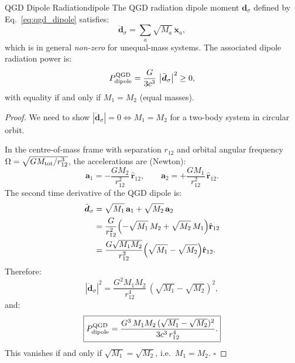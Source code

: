 \documentclass[11pt,a4paper]{article}
\theoremstyle{definition}
\theoremstyle{remark}
\newcommand{\bolda}{\mathbf{a}}
\newcommand{\bhat}[1]{\hat{\mathbf{#1}}}
\newcommand{\boldx}{\mathbf{x}}
\begin{document}
	\begin{theorem}{QGD Dipole Radiation}{dipole}
		The QGD radiation dipole moment $\boldsymbol{d}_\sigma$ defined by
		Eq.~\eqref{eq:qgd_dipole} satisfies:
		\begin{equation}
			\ddot{\boldsymbol{d}}_\sigma
			= \sum_a \sqrt{M_a}\,\ddot{\boldx}_a,
			\label{eq:dipole_ddot}
		\end{equation}
		which is in general \emph{non-zero} for unequal-mass systems.
		The associated dipole radiation power is:
		\begin{equation}
			P_{\rm dipole}^{\rm QGD}
			= \frac{G}{3c^3}\,\left|\ddot{\boldsymbol{d}}_\sigma\right|^2
			\geq 0,
			\label{eq:dipole_power}
		\end{equation}
		with equality if and only if $M_1=M_2$ (equal masses).
	\end{theorem}
	
	\begin{proof}
		We need to show $|\ddot{\boldsymbol{d}}_\sigma|=0\Leftrightarrow M_1=M_2$
		for a two-body system in circular orbit.
		
		In the centre-of-mass frame with separation $r_{12}$ and orbital
		angular frequency $\Omega=\sqrt{GM_{\rm tot}/r_{12}^3}$, the
		accelerations are (Newton):
		\begin{equation}
			\bolda_1 = -\frac{GM_2}{r_{12}^2}\,\bhat{r}_{12},
			\qquad
			\bolda_2 = +\frac{GM_1}{r_{12}^2}\,\bhat{r}_{12}.
			\label{eq:accelerations}
		\end{equation}
		The second time derivative of the QGD dipole is:
		\begin{align}
			\ddot{\boldsymbol{d}}_\sigma
			&= \sqrt{M_1}\,\bolda_1 + \sqrt{M_2}\,\bolda_2
			\nonumber\\
			&= \frac{G}{r_{12}^2}
			\Bigl(-\sqrt{M_1}\,M_2 + \sqrt{M_2}\,M_1\Bigr)\bhat{r}_{12}
			\nonumber\\
			&= \frac{G\sqrt{M_1 M_2}}{r_{12}^2}
			\Bigl(\sqrt{M_1}-\sqrt{M_2}\Bigr)\bhat{r}_{12}.
			\label{eq:dipole_ddot_explicit}
		\end{align}
		Therefore:
		\begin{equation}
			\left|\ddot{\boldsymbol{d}}_\sigma\right|^2
			= \frac{G^2 M_1 M_2}{r_{12}^4}\,(\sqrt{M_1}-\sqrt{M_2})^2,
			\label{eq:dipole_ddot_squared}
		\end{equation}
		and:
		\begin{equation}
			\boxed{
				P_{\rm dipole}^{\rm QGD}
				= \frac{G^3\,M_1 M_2\,(\sqrt{M_1}-\sqrt{M_2})^2}{3c^3\,r_{12}^4}.
			}
			\label{eq:dipole_power_explicit}
		\end{equation}
		This vanishes if and only if $\sqrt{M_1}=\sqrt{M_2}$, i.e.\ $M_1=M_2$.
		\hfill$\square$
	\end{proof}
	
\end{document}
